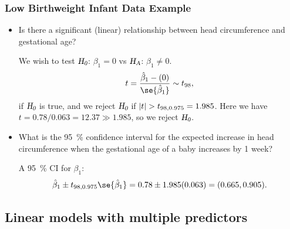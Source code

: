 \documentclass[oneside]{book}\usepackage[]{graphicx}\usepackage[svgnames]{xcolor}
\newcommand{\HN}{\textsl{H}_{\textsl{0}}}%
\newcommand{\HA}{\textsl{H}_{\textsl{A}}}%
\DeclarePairedDelimiter\abs{\lvert}{\rvert}
\begin{document}
\subsubsection*{Low Birthweight Infant Data Example}
\begin{itemize}
      \item Is there a significant (linear) relationship between head circumference and
            gestational age?

            We wish to test $ \HN $: $ \beta_1=0 $ vs $ \HA $: $ \beta_1\ne 0 $.
            \[ t=\frac{\hat{\beta}_1-(0)}{\se{\hat{\beta}_1}}\sim t_{98}, \]
            if $ \HN $ is true, and we reject $ \HN $ if $ \abs{t}>t_{98,0.975}=1.985 $.
            Here we have $ t=0.78/0.063=12.37\gg 1.985 $, so we reject $ \HN $.
      \item What is the \qty{95}{\percent} confidence interval for the expected increase in head
            circumference when the gestational age of a baby increases by 1 week?

            A \qty{95}{\percent} CI for $ \beta_1 $:
            \[ \hat{\beta}_1\pm t_{98,0.975}\se{\hat{\beta}_1}=0.78\pm 1.985(0.063)=(0.665,0.905). \]
\end{itemize}

\subsection*{Linear models with multiple predictors}
\end{document}
